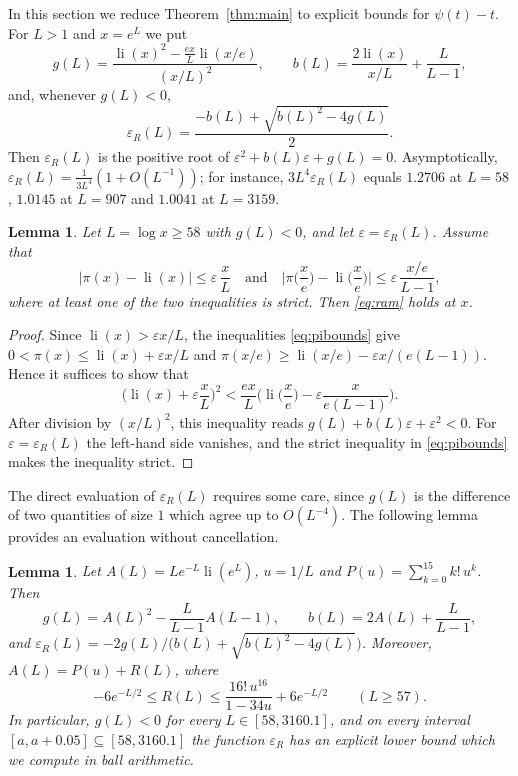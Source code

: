 \documentclass[11pt]{amsart}
\numberwithin{equation}{section}
\newtheorem{lemma}[theorem]{Lemma}
\theoremstyle{definition}
\theoremstyle{remark}
\newcommand{\li}{\operatorname{li}}
\newcommand{\eps}{\varepsilon}
\begin{document}
In this section we reduce Theorem~\ref{thm:main} to explicit bounds for $\psi(t) - t$.
For $L > 1$ and $x = e^L$ we put
\begin{equation}\label{eq:gb}
g(L) = \frac{\li(x)^2 - \frac{ex}{L}\li(x/e)}{(x/L)^2}, \qquad b(L) = \frac{2\li(x)}{x/L} + \frac{L}{L-1},
\end{equation}
and, whenever $g(L) < 0$,
\begin{equation}\label{eq:epsR}
\eps_R(L) = \frac{-b(L) + \sqrt{b(L)^2 - 4g(L)}}{2}.
\end{equation}
Then $\eps_R(L)$ is the positive root of $\eps^2 + b(L)\eps + g(L) = 0$.
Asymptotically, $\eps_R(L) = \frac{1}{3L^4}(1 + O(L^{-1}))$; for instance, $3L^4\eps_R(L)$ equals $1.2706$ at $L = 58$, $1.0145$ at $L = 907$ and $1.0041$ at $L = 3159$.

\begin{lemma}\label{lem:reduce}
Let $L = \log x \geq 58$ with $g(L) < 0$, and let $\eps = \eps_R(L)$.
Assume that
\begin{equation}\label{eq:pibounds}
|\pi(x) - \li(x)| \leq \eps\,\frac{x}{L} \quad\text{and}\quad \Big|\pi\Big(\frac xe\Big) - \li\Big(\frac xe\Big)\Big| \leq \eps\,\frac{x/e}{L-1},
\end{equation}
where at least one of the two inequalities is strict.
Then \eqref{eq:ram} holds at $x$.
\end{lemma}

\begin{proof}
Since $\li(x) > \eps x/L$, the inequalities \eqref{eq:pibounds} give $0 < \pi(x) \leq \li(x) + \eps x/L$ and $\pi(x/e) \geq \li(x/e) - \eps x/(e(L-1))$.
Hence it suffices to show that
\[
\Big(\li(x) + \eps\frac{x}{L}\Big)^2 < \frac{ex}{L}\Big(\li\Big(\frac xe\Big) - \eps\frac{x}{e(L-1)}\Big).
\]
After division by $(x/L)^2$, this inequality reads $g(L) + b(L)\eps + \eps^2 < 0$.
For $\eps = \eps_R(L)$ the left-hand side vanishes, and the strict inequality in \eqref{eq:pibounds} makes the inequality strict.
\end{proof}

The direct evaluation of $\eps_R(L)$ requires some care, since $g(L)$ is the difference of two quantities of size $1$ which agree up to $O(L^{-4})$.
The following lemma provides an evaluation without cancellation.

\begin{lemma}\label{lem:epsR}
Let $A(L) = Le^{-L}\li(e^L)$, $u = 1/L$ and $P(u) = \sum_{k=0}^{15}k!\,u^k$.
Then
\[
g(L) = A(L)^2 - \frac{L}{L-1}A(L-1), \qquad b(L) = 2A(L) + \frac{L}{L-1},
\]
and $\eps_R(L) = -2g(L)/\big(b(L) + \sqrt{b(L)^2 - 4g(L)}\big)$.
Moreover, $A(L) = P(u) + R(L)$, where
\begin{equation}\label{eq:Rbound}
-6e^{-L/2} \leq R(L) \leq \frac{16!\,u^{16}}{1 - 34u} + 6e^{-L/2} \qquad (L \geq 57).
\end{equation}
In particular, $g(L) < 0$ for every $L \in [58, 3160.1]$, and on every interval $[a, a + 0.05] \subseteq [58, 3160.1]$ the function $\eps_R$ has an explicit lower bound which we compute in ball arithmetic.
\end{lemma}
\end{document}
